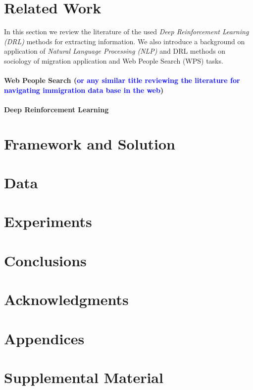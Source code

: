 \documentclass[11pt,a4paper]{article}
\newcommand{\PA}[1]{{\textcolor{blue}{#1}}}
\begin{document}



\section{Related Work}

In this section we review the literature of the used \textit{Deep Reinforcement Learning (DRL)} methods for extracting information. We also introduce a background on application of \textit{Natural Language Processing (NLP)} and DRL methods on sociology of migration application and Web People Search (WPS) tasks. 

\paragraph{Web People Search (\PA{or any similar title reviewing the literature for navigating immigration data base in the web})}

\paragraph{Deep Reinforcement Learning}


\section{Framework and Solution}


\section{Data}


\section{Experiments}

\section{Conclusions}

\section*{Acknowledgments}




\appendix

\section{Appendices}
\label{sec:appendix}


\section{Supplemental Material}
\label{sec:supplemental}
\end{document}
